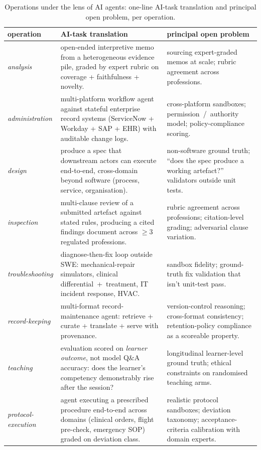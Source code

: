 \documentclass{article}
\begin{document}
\begin{table}[t]
\caption{Operations under the lens of AI agents: one-line AI-task
  translation and principal open problem, per operation.}
\label{tab:opslens}
\centering
\scriptsize
\begin{tabularx}{\linewidth}{lXX}
\toprule
operation & AI-task translation & principal open problem \\
\midrule
\emph{analysis} & open-ended interpretive memo from a heterogeneous evidence pile, graded by expert rubric on coverage + faithfulness + novelty. & sourcing expert-graded memos at scale; rubric agreement across professions. \\
\emph{administration} & multi-platform workflow agent against stateful enterprise record systems (ServiceNow + Workday + SAP + EHR) with auditable change logs. & cross-platform sandboxes; permission~/~authority model; policy-compliance scoring. \\
\emph{design} & produce a spec that downstream actors can execute end-to-end, cross-domain beyond software (process, service, organisation). & non-software ground truth; ``does the spec produce a working artefact?'' validators outside unit tests. \\
\emph{inspection} & multi-clause review of a submitted artefact against stated rules, producing a cited findings document across $\geq\!3$ regulated professions. & rubric agreement across professions; citation-level grading; adversarial clause variation. \\
\emph{troubleshooting} & diagnose-then-fix loop outside SWE: mechanical-repair simulators, clinical differential~+~treatment, IT incident response, HVAC. & sandbox fidelity; ground-truth fix validation that isn't unit-test pass. \\
\emph{record-keeping} & multi-format record-maintenance agent: retrieve + curate + translate + serve with provenance. & version-control reasoning; cross-format consistency; retention-policy compliance as a scoreable property. \\
\emph{teaching} & evaluation scored on \emph{learner outcome}, not model Q\&A accuracy: does the learner's competency demonstrably rise after the session? & longitudinal learner-level ground truth; ethical constraints on randomised teaching arms. \\
\emph{protocol-execution} & agent executing a prescribed procedure end-to-end across domains (clinical orders, flight pre-check, emergency SOP) graded on deviation class. & realistic protocol sandboxes; deviation taxonomy; acceptance-criteria calibration with domain experts. \\

\end{tabularx}
\end{table}
\end{document}
